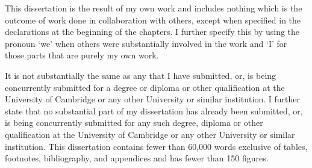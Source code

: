 
\begin{declaration}

This dissertation is the result of my own work and includes nothing which is the outcome of work done in collaboration with others, except when specified in the declarations at the beginning of the chapters. I further specify this by using the pronoun `we' when others were substantially involved in the work and `I' for those parts that are purely my own work. 

\bigskip

It is not substantially the same as any that I have submitted, or, is being concurrently submitted for a degree or diploma or other qualification at the University of Cambridge or any other University or similar institution. I further state that no substantial part of my dissertation has already been submitted, or, is being concurrently submitted for any such degree, diploma or other qualification at the University of Cambridge or any other University or similar institution. This dissertation contains fewer than 60,000 words exclusive of tables, footnotes, bibliography, and appendices and has fewer than 150 figures.


\end{declaration}

